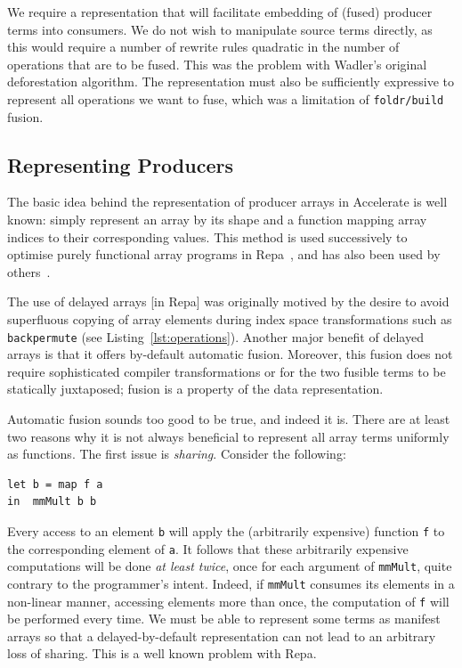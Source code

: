 We require a representation that will facilitate embedding of (fused) producer
terms into consumers. We do not wish to manipulate source terms directly, as
this would require a number of rewrite rules quadratic in the number of
operations that are to be fused. This was the problem with Wadler's original
deforestation algorithm. The representation must also be sufficiently expressive
to represent all operations we want to fuse, which was a limitation of
\texttt{foldr/build} fusion.

\subsection{Representing Producers}
\label{sec:representing_producers}

The basic idea behind the representation of producer arrays in Accelerate is
well known: simply represent an array by its shape and a function mapping array
indices to their corresponding values. This method is used successively to
optimise purely functional array programs in Repa~\cite{Keller:2010er}, and has also been used by
others~\cite{Claessen:2012hl}.

The use of delayed arrays [in Repa] was originally motived by the desire to
avoid superfluous copying of array elements during index space transformations
such as \texttt{backpermute} (see Listing~\ref{lst:operations}). Another major
benefit of delayed arrays is that it offers by-default automatic fusion.
Moreover, this fusion does not require sophisticated compiler transformations or
for the two fusible terms to be statically juxtaposed; fusion is a property of
the data representation.

Automatic fusion sounds too good to be true, and indeed it is. There are at
least two reasons why it is not always beneficial to represent all array terms
uniformly as functions. The first issue is \emph{sharing}. Consider the
following:
%
\begin{lstlisting}[style=haskell]
let b = map f a
in  mmMult b b
\end{lstlisting}
%
Every access to an element \texttt{b} will apply the (arbitrarily expensive)
function \texttt{f} to the corresponding element of \texttt{a}. It follows that
these arbitrarily expensive computations will be done \emph{at least twice},
once for each argument of \texttt{mmMult}, quite contrary to the programmer's
intent. Indeed, if \texttt{mmMult} consumes its elements in a non-linear manner,
accessing elements more than once, the computation of \texttt{f} will be
performed every time. We must be able to represent some terms as manifest arrays
so that a delayed-by-default representation can not lead to an arbitrary loss of
sharing. This is a well known problem with Repa.

